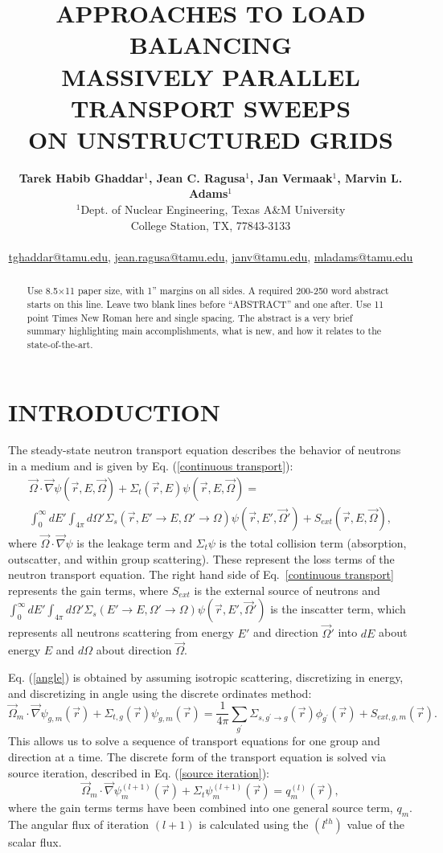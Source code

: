 \documentclass[letterpaper]{mandc2019}
\title{APPROACHES TO LOAD BALANCING \\
MASSIVELY PARALLEL TRANSPORT SWEEPS\\
ON UNSTRUCTURED GRIDS}
\author{%
  \textbf{Tarek Habib Ghaddar$^1$, Jean C. Ragusa$^1$, Jan Vermaak$^1$, Marvin L. Adams$^1$} \\
$^1$Dept. of Nuclear Engineering, Texas  A\&M University \\
  College Station, TX, 77843-3133 \\ 
     \\
  \url{tghaddar@tamu.edu}, \url{jean.ragusa@tamu.edu}, \url{janv@tamu.edu}, \url{mladams@tamu.edu}
}
\newcommand{\vr}{\vec{r}}
\newcommand{\vo}{\vec{\Omega}}
\begin{document}
\maketitle
\justify 

\begin{abstract}
  Use 8.5$\times$11 paper size, with 1'' margins on all sides.  A required 200-250 
  word abstract starts on this line.  Leave two blank lines before ``ABSTRACT''
  and one after.  Use 11 point Times New Roman here and single 
  spacing. The abstract is a very brief summary highlighting main 
  accomplishments, what is new, and how it relates to the state-of-the-art.
\end{abstract}

\section{INTRODUCTION} 
The steady-state neutron transport equation describes the behavior of neutrons in a medium and is given by Eq. (\ref{continuous transport}):
\begin{multline}
\vo \cdot \vec \nabla \psi(\vr,E,\vo) + \Sigma_t(\vr,E) \psi(\vr,E,\vo)  = \\ 
\int_{0}^{\infty}dE' \int_{4\pi}d\Omega' \Sigma_s(\vr,E'\to E, \Omega'\to\Omega)\psi(\vr,E',\vo')  + S_{ext}(\vr,E,\vo) ,
\label{continuous transport}
\end{multline}
where $\vec{\Omega}\cdot \vec\nabla\psi$ is the leakage term and $\Sigma_t\psi$ is the total collision term (absorption, outscatter, and within group scattering). These represent the loss terms of the neutron transport equation. The right hand side of Eq.~\eqref{continuous transport} represents the gain terms, where $S_{ext}$ is the external source of neutrons and $\int_{0}^{\infty}dE'\int_{4\pi}d\Omega'\Sigma_s(E'\to E, \Omega'\to\Omega)\psi(\vr,E',\vo')$ is the inscatter term, which represents all neutrons scattering from energy $E'$ and direction $\vo'$ into $dE$ about energy $E$ and $d\Omega$ about direction $\vo$. 

Eq. (\ref{angle}) is obtained by assuming isotropic scattering, discretizing in energy, and discretizing in angle using the discrete ordinates method\cite{discrete ordinates}:
\begin{equation}
\vo_m \cdot \vec \nabla \psi_{g,m}(\vr) +\Sigma_{t,g}(\vr) \psi_{g,m}(\vr)  = \frac{1}{4\pi}\sum_{g^{\prime}}\Sigma_{s,g^{\prime}\to g}(\vr)\phi_{g^{\prime}}(\vr) + S_{ext,g,m}(\vr).
\label{angle}
\end{equation}
This allows us to solve a sequence of transport equations for one group and direction at a time. The discrete form of the transport equation is solved via source iteration, described in Eq. (\ref{source iteration}):
\begin{equation}
\vo_m \cdot \vec\nabla \psi_m^{(l+1)}(\vr) + \Sigma_t \psi_m^{(l+1)}(\vr) = q_m^{(l)}(\vr),
\label{source iteration}
\end{equation}
where the gain terms terms have been combined into one general source term, $q_m$. The angular flux of iteration $(l+1)$ is calculated using the $(l^{th})$ value of the scalar flux. 
\end{document}
